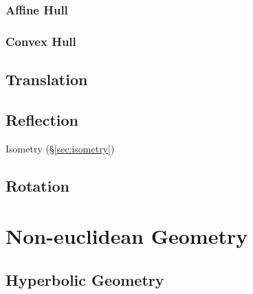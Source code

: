 \subsubsection{Affine Hull}\label{sec:affine_hull}

\subsubsection{Convex Hull}\label{sec:convex_hull}



\subsection{Translation}\label{sec:translation}

\subsection{Reflection}\label{sec:reflection}

Isometry (\S\ref{sec:isometry})



\subsection{Rotation}\label{sec:rotation}



\section{Non-euclidean Geometry}\label{sec:noneuclidean_geometry}

\subsection{Hyperbolic Geometry}\label{sec:hyperbolic_geometry}

